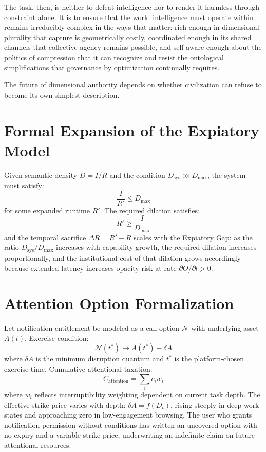 \documentclass[12pt]{article}
\begin{document}
The task, then, is neither to defeat intelligence nor to render it harmless through constraint alone. It is to ensure that the world intelligence must operate within remains irreducibly complex in the ways that matter: rich enough in dimensional plurality that capture is geometrically costly, coordinated enough in its shared channels that collective agency remains possible, and self-aware enough about the politics of compression that it can recognize and resist the ontological simplifications that governance by optimization continually requires.

The future of dimensional authority depends on whether civilization can refuse to become its own simplest description.

\appendix

\section{Formal Expansion of the Expiatory Model}

Given semantic density $D = I/R$ and the condition $D_{\text{sys}} \gg D_{\max}$, the system must satisfy:
\[
\frac{I}{R'} \le D_{\max}
\]
for some expanded runtime $R'$. The required dilation satisfies:
\[
R' \ge \frac{I}{D_{\max}}
\]
and the temporal sacrifice $\Delta R = R' - R$ scales with the Expiatory Gap: as the ratio $D_{\text{sys}}/D_{\max}$ increases with capability growth, the required dilation increases proportionally, and the institutional cost of that dilation grows accordingly because extended latency increases opacity risk at rate $\partial O/\partial l > 0$.

\section{Attention Option Formalization}

Let notification entitlement be modeled as a call option $\mathcal{N}$ with underlying asset $A(t)$. Exercise condition:
\[
\mathcal{N}(t^*) \rightarrow A(t^*) - \delta A
\]
where $\delta A$ is the minimum disruption quantum and $t^*$ is the platform-chosen exercise time. Cumulative attentional taxation:
\[
C_{\text{attention}} = \sum_i c_i w_i
\]
where $w_i$ reflects interruptibility weighting dependent on current task depth. The effective strike price varies with depth: $\delta A = f(D_t)$, rising steeply in deep-work states and approaching zero in low-engagement browsing. The user who grants notification permission without conditions has written an uncovered option with no expiry and a variable strike price, underwriting an indefinite claim on future attentional resources.
\end{document}

